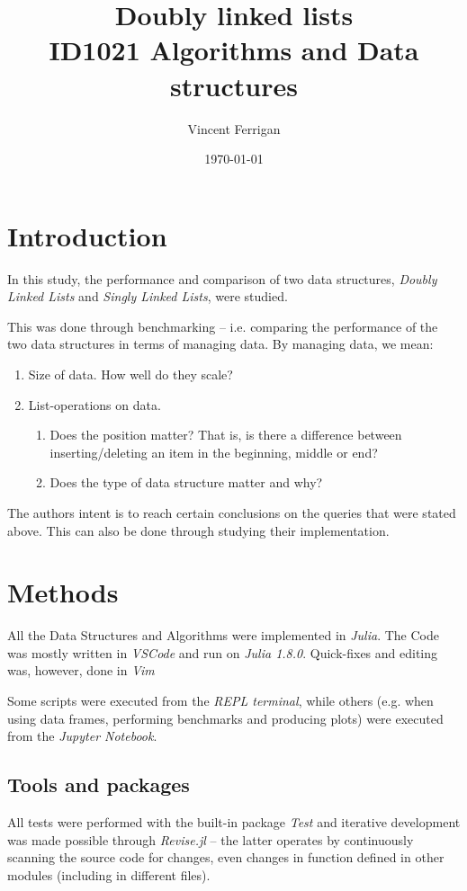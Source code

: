 \documentclass[a4paper, 11pt]{article}
\title{Doubly linked lists\\ \small{ID1021 Algorithms and Data structures}} %
\author{Vincent Ferrigan}
\date{\today}
\begin{document}
    \maketitle
    \section*{Introduction}
    In this study, the performance and comparison of two data structures,
    \emph{Doubly Linked Lists} and \emph{Singly Linked Lists}, were studied. 
    
    This was done through benchmarking -- i.e. comparing the performance of
    the two data structures in terms of managing data. 
    By managing data, we mean:
    
    \begin{enumerate}[label*=\arabic*.]
        \item Size of data. How well do they scale? 
        \item List-operations on data. 
        \begin{enumerate}[label*=\arabic*.]
                \item Does the position matter? 
                That is, is there a difference between inserting/deleting an 
                item in the beginning, middle or end? 
                \item Does the type of data structure matter and why?
            \end{enumerate}
    \end{enumerate}

    The authors intent is to reach certain conclusions on the queries that were stated above. 
    This can also be done through studying their implementation.
    
            
    \section*{Methods}
    All the Data Structures and Algorithms were implemented in \emph{Julia}.
    The Code was mostly written in \emph{VSCode} and run on \emph{Julia 1.8.0}.
    Quick-fixes and editing was, however, done in \emph{Vim}

    Some scripts were executed from the \emph{REPL terminal},  while others (e.g.
    when using data frames, performing benchmarks and producing plots) were executed from the
    \emph{Jupyter Notebook}. 
    
    \subsection*{Tools and packages}
    All tests were performed with the built-in package \emph{Test} and iterative development
    was made possible through \emph{Revise.jl} -- the latter operates by continuously
    scanning the source code for changes, even changes in function defined in
    other modules (including in different files).
    
\end{document}
